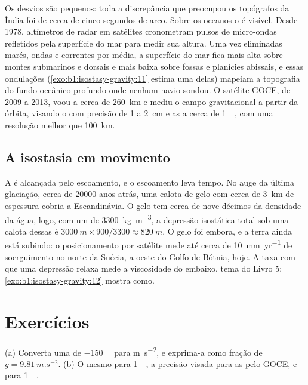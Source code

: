 Os desvios são pequenos: toda a discrepância que preocupou os topógrafos
da Índia foi de cerca de cinco segundos de arco. Sobre os oceanos o  é visível.
Desde 1978, altímetros de radar em satélites cronometram pulsos de micro-ondas
refletidos pela superfície do mar para medir sua altura. Uma vez eliminadas marés, ondas e
correntes por média, a superfície do mar fica mais alta sobre montes submarinos e
dorsais e mais baixa sobre fossas e planícies abissais, e essas ondulações (\cref{exo:b1:isostasy-gravity:11}
estima uma delas) mapeiam a topografia do fundo oceânico profundo onde nenhum navio sondou.
O satélite GOCE, de 2009 a 2013, voou a cerca de \qty{260}{km}
e mediu o campo gravitacional a partir da órbita, visando o  com precisão de 1 a
\qty{2}{cm} e as  a cerca de \qty{1}{\milli\gal}, com uma
resolução melhor que \qty{100}{km}.

\subsection*{A isostasia em movimento}

A  é alcançada pelo escoamento, e o escoamento leva tempo. No auge da última
glaciação, cerca de \num{20000} anos atrás, uma calota de gelo com cerca de \qty{3}{km} de espessura
cobria a Escandinávia.
O gelo tem cerca de nove décimos da densidade da água, logo, com um  de
\qty{3300}{kg.m^{-3}}, a depressão isostática total sob uma calota dessas é
$\qty{3000}{m}\times900/3300 \approx \qty{820}{m}$. O gelo foi embora, e a
terra ainda está subindo: o posicionamento por satélite mede até cerca de
\qty{10}{mm.yr^{-1}} de soerguimento no norte da Suécia, a oeste do Golfo de Bótnia,
hoje. A
taxa com que uma depressão relaxa mede a viscosidade do  embaixo,
tema do Livro 5; \cref{exo:b1:isostasy-gravity:12} mostra como.

\section{Exercícios}

\begin{exercise}[$\star$]\label{exo:b1:isostasy-gravity:1}
(a) Converta uma  de \qty{-150}{\milli\gal} para \unit{m.s^{-2}},
e exprima-a como fração de $g = \qty{9.81}{m.s^{-2}}$. (b) O mesmo para
\qty{1}{\milli\gal}, a precisão visada para as  pelo GOCE, e para \qty{1}{\micro\gal}.
\end{exercise}

